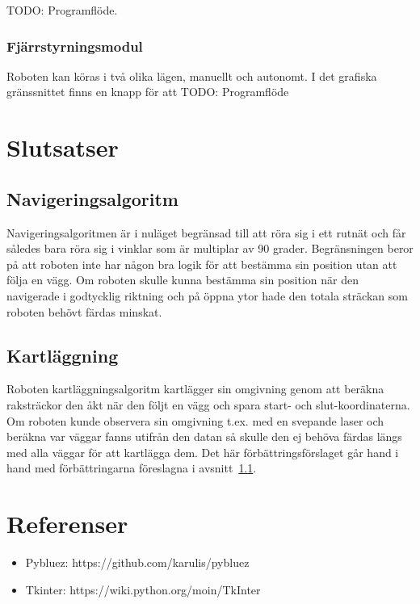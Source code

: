 \documentclass{article}
\begin{document}
TODO: Programflöde.

\subsubsection{Fjärrstyrningsmodul}
Roboten kan köras i två olika lägen, manuellt och autonomt. I det grafiska gränssnittet finns en knapp för att 
TODO: Programflöde

\clearpage
\section{Slutsatser}

\subsection{Navigeringsalgoritm}
\label{sec:slutsatser_navigering}
Navigeringsalgoritmen är i nuläget begränsad till att röra sig i ett rutnät och får således bara röra sig i vinklar som är multiplar av 90 grader. Begränsningen beror på att roboten inte har någon bra logik för att bestämma sin position utan att följa en vägg. Om roboten skulle kunna bestämma sin position när den navigerade i godtycklig riktning och på öppna ytor hade den totala sträckan som roboten behövt färdas minskat.

\subsection{Kartläggning}
Roboten kartläggningsalgoritm kartlägger sin omgivning genom att beräkna raksträckor den åkt när den följt en vägg och spara start- och slut-koordinaterna. Om roboten kunde observera sin omgivning t.ex. med en svepande laser och beräkna var väggar fanns utifrån den datan så skulle den ej behöva färdas längs med alla väggar för att kartlägga dem. Det här förbättringsförslaget går hand i hand med förbättringarna föreslagna i avsnitt~\ref{sec:slutsatser_navigering}.

\clearpage
\section{Referenser}
\begin{itemize}
    \item Pybluez: https://github.com/karulis/pybluez
    \item Tkinter: https://wiki.python.org/moin/TkInter
\end{itemize}
\end{document}
